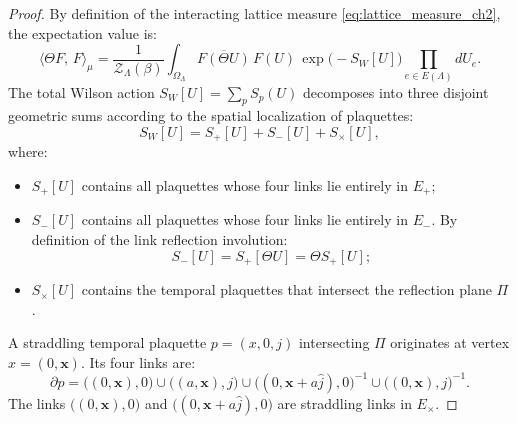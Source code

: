 \begin{proof}
By definition of the interacting lattice measure \eqref{eq:lattice_measure_ch2}, the expectation value is:
\begin{equation}
\label{eq:rp_integral_start}
\langle \Theta F, \, F \rangle_\mu = \frac{1}{\mathcal{Z}_\Lambda(\beta)} \int_{\Omega_\Lambda} \overline{F(\Theta U)} \, F(U) \, \exp\bigl( -S_W[U] \bigr) \prod_{e \in E(\Lambda)} dU_e.
\end{equation}
The total Wilson action $S_W[U] = \sum_{p} S_p(U)$ decomposes into three disjoint geometric sums according to the spatial localization of plaquettes:
\begin{equation}
S_W[U] = S_+[U] + S_-[U] + S_\times[U],
\end{equation}
where:
\begin{itemize}
    \item $S_+[U]$ contains all plaquettes whose four links lie entirely in $E_+$;
    \item $S_-[U]$ contains all plaquettes whose four links lie entirely in $E_-$. By definition of the link reflection involution:
    \begin{equation}
    S_-[U] = S_+[\Theta U] = \Theta S_+[U];
    \end{equation}
    \item $S_\times[U]$ contains the temporal plaquettes that intersect the reflection plane $\Pi$.
\end{itemize}

A straddling temporal plaquette $p = (x, 0, j)$ intersecting $\Pi$ originates at vertex $x = (0, \mathbf{x})$. Its four links are:
\begin{equation}
\partial p = \bigl( (0, \mathbf{x}), 0 \bigr) \cup \bigl( (a, \mathbf{x}), j \bigr) \cup \bigl( (0, \mathbf{x} + a\hat{j}), 0 \bigr)^{-1} \cup \bigl( (0, \mathbf{x}), j \bigr)^{-1}.
\end{equation}
The links $\bigl( (0, \mathbf{x}), 0 \bigr)$ and $\bigl( (0, \mathbf{x} + a\hat{j}), 0 \bigr)$ are straddling links in $E_\times$. 


\end{proof}
